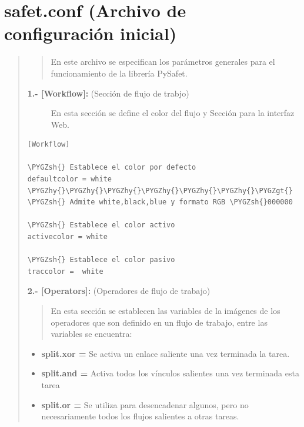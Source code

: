 \documentclass[letterpaper,11pt,spanish]{sphinxmanual}
\def\PYGZgt{\char`\>}
\def\PYGZsh{\char`\#}
\def\PYGZhy{\char`\-}
\begin{document}
\chapter{\textbf{safet.conf} (Archivo de configuración inicial)}
\label{_templates/Contenido2/safet_conf:safet-conf-archivo-de-configuracion-inicial}\label{_templates/Contenido2/safet_conf::doc}\begin{quote}
\begin{quote}

En este archivo se especifican los parámetros generales para el funcionamiento de la librería PySafet.
\end{quote}
\begin{description}
\item[{\textbf{1.- {[}Workflow{]}:} (Sección de flujo de trabjo)}] \leavevmode
En esta sección se define el color del flujo y Sección para la interfaz Web.

\end{description}

\begin{Verbatim}[commandchars=\\\{\}]
[Workflow]

\PYGZsh{} Establece el color por defecto
defaultcolor = white            \PYGZhy{}\PYGZhy{}\PYGZhy{}\PYGZhy{}\PYGZhy{}\PYGZhy{}\PYGZgt{} \PYGZsh{} Admite white,black,blue y formato RGB \PYGZsh{}000000

\PYGZsh{} Establece el color activo
activecolor = white

\PYGZsh{} Establece el color pasivo
traccolor =  white
\end{Verbatim}

\textbf{2.- {[}Operators{]}:} (Operadores de flujo de trabajo)
\begin{quote}

En esta sección se establecen las variables de la imágenes de los operadores que son definido en un flujo de trabajo, entre las variables se encuentra:
\end{quote}
\begin{itemize}
\item {} 
\textbf{split.xor =} Se activa un enlace saliente una vez terminada la tarea.

\item {} 
\textbf{split.and =} Activa todos los vínculos salientes una vez terminada esta tarea

\item {} 
\textbf{split.or =} Se utiliza para desencadenar algunos, pero no necesariamente todos los flujos salientes a otras tareas.


\end{itemize}
\end{quote}
\end{document}
